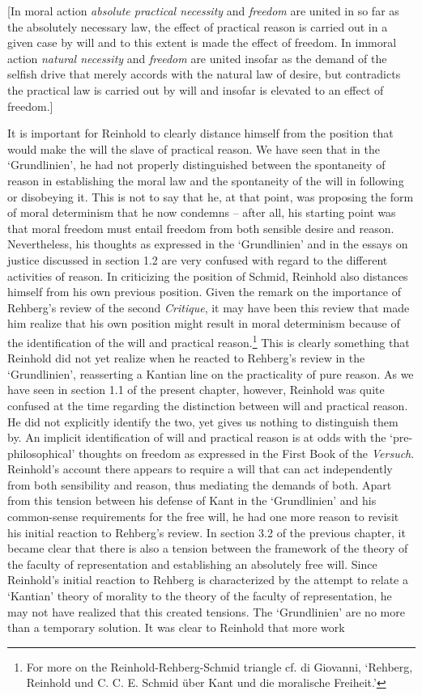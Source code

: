 [In moral action \textit{absolute practical necessity} and \textit{freedom} are united in so far as the absolutely necessary law, the effect of practical reason is carried out in a given case by will and to this extent is made the effect of freedom. In immoral action \textit{natural necessity} and \textit{freedom} are united insofar as the demand of the selfish drive that merely accords with the natural law of desire, but contradicts the practical law is carried out by will and insofar is elevated to an effect of freedom.] 

It is important for Reinhold to clearly distance himself from the position that would make the will the slave of practical reason. We have seen that in the `Grundlinien', he had not properly distinguished between the spontaneity of reason in establishing the moral law and the spontaneity of the will in following or disobeying it. This is not to say that he, at that point, was proposing the form of moral determinism that he now condemns {--} after all, his starting point was that moral freedom must entail freedom from both sensible desire and reason. Nevertheless, his thoughts as expressed in the `Grundlinien' and in the essays on justice discussed in section 1.2 are very confused with regard to the different activities of reason. In criticizing the position of Schmid, Reinhold also distances himself from his own previous position. Given the remark on the importance of Rehberg's review of the second \textit{Critique}, it may have been this review that made him realize that his own position might result in moral determinism because of the identification of the will and practical reason.\footnote{ For more on the Reinhold{-}Rehberg{-}Schmid triangle cf. di Giovanni, `Rehberg, Reinhold und C. C. E. Schmid \"{u}ber Kant und die moralische Freiheit.'} This is clearly something that Reinhold did not yet realize when he reacted to Rehberg's review in the `Grundlinien', reasserting a Kantian line on the practicality of pure reason. As we have seen in section 1.1 of the present chapter, however, Reinhold was quite confused at the time regarding the distinction between will and practical reason. He did not explicitly identify the two, yet gives us nothing to distinguish them by. An implicit identification of will and practical reason is at odds with the `pre{-}philosophical' thoughts on freedom as expressed in the First Book of the \textit{Versuch}. Reinhold's account there appears to require a will that can act independently from both sensibility and reason, thus mediating the demands of both. Apart from this tension between his defense of Kant in the `Grundlinien' and his common{-}sense requirements for the free will, he had one more reason to revisit his initial reaction to Rehberg's review. In section 3.2 of the previous chapter, it became clear that there is also a tension between the framework of the theory of the faculty of representation and establishing an absolutely free will. Since Reinhold's initial reaction to Rehberg is characterized by the attempt to relate a `Kantian' theory of morality to the theory of the faculty of representation, he may not have realized that this created tensions. The `Grundlinien' are no more than a temporary solution. It was clear to Reinhold that more work 